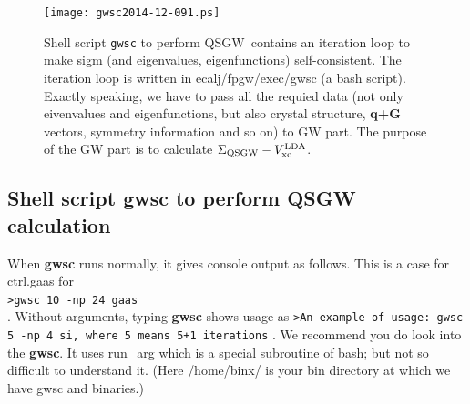 \documentclass[a4paper,10pt,epsf,fleqn]{article}
\newcommand{\exe}[1]{{\bf #1}}
\newcommand{\io}[1]{{\sf  #1}}
\newcommand{\QSGW}{QSGW\ }
\begin{document}
\begin{figure}[h]
\texttt{[image: gwsc2014-12-091.ps]}
\caption[]{Shell script {\tt gwsc} to perform \QSGW contains 
an iteration loop to make sigm (and eigenvalues, eigenfunctions)
self-consistent. The iteration loop is written in 
ecalj/fpgw/exec/gwsc (a bash script). 
Exactly speaking, we have to pass all the requied data 
(not only eivenvalues and eigenfunctions, but also 
crystal structure, {\bf q+G} vectors, symmetry information and so on) to GW part.
The purpose of the GW part is to calculate $\Sigma_{\rm QSGW}-V_{\rm xc}^{\rm LDA}$.}
\label{gwscpicture}
\end{figure}

\newpage
\subsection{Shell script \exe{gwsc} to perform QSGW calculation}
When \exe{gwsc} runs normally, it gives console output as follows.
This is a case for \io{ctrl.gaas} for\\
\verb#>gwsc 10 -np 24 gaas#\\
. Without arguments, typing \exe{gwsc} shows usage as 
\verb#>An example of usage: gwsc 5 -np 4 si, where 5 means 5+1 iterations#
. We recommend you do look into the \exe{gwsc}. 
It uses \io{run\_arg} which is a special
subroutine of bash; but not so difficult to understand it.
(Here \io{/home/binx/} is your bin directory at which we have gwsc and binaries.)
\end{document}
